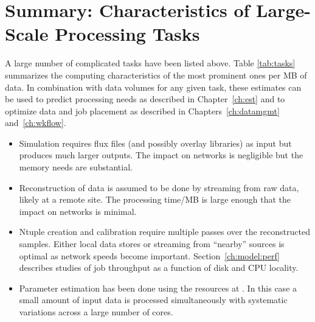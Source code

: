 \documentclass[../main-v1.tex]{subfiles}
\begin{document}

\section{Summary: Characteristics of Large-Scale Processing Tasks}

A large number of complicated tasks have been listed above.  Table \ref{tab:tasks} summarizes the computing characteristics of the most prominent ones per MB of data. In combination with data volumes for any given task, these estimates can be used to predict processing needs as described in Chapter~\ref{ch:est} and to optimize data and job placement as described in Chapters~\ref{ch:datamgmt} and~\ref{ch:wkflow}. 

\begin{itemize}
    \item Simulation requires flux files (and possibly overlay libraries) as input but produces much larger outputs. The impact on networks is negligible but the memory needs are substantial.
    \item Reconstruction of data is assumed to be done by streaming from raw data, likely at a remote site. The processing time/MB is large enough that the impact on networks is minimal. 
    \item Ntuple creation and calibration require multiple passes over the reconstructed samples. Either local data stores or streaming from ``nearby'' sources is optimal as network speeds become important. Section~\ref{ch:model:perf} describes studies of job throughput as a function of disk and CPU locality. 
    \item Parameter estimation has been done using the  resources at .  In this case a small amount of input data is processed simultaneously with systematic variations across a large number of cores. 

\end{itemize}
\end{document}

